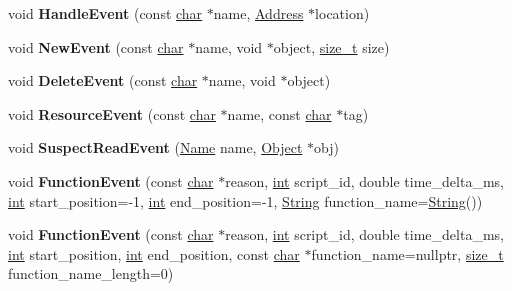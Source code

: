 \begin{DoxyCompactItemize}
void {\bfseries Handle\+Event} (const \mbox{\hyperlink{classchar}{char}} $\ast$name, \mbox{\hyperlink{classuintptr__t}{Address}} $\ast$location)
\item 
\mbox{\label{classv8_1_1internal_1_1Logger_a32c89d2d5ca535c3e0b9e00b73275528}} 
void {\bfseries New\+Event} (const \mbox{\hyperlink{classchar}{char}} $\ast$name, void $\ast$object, \mbox{\hyperlink{classsize__t}{size\+\_\+t}} size)
\item 
\mbox{\label{classv8_1_1internal_1_1Logger_a1d8c8690eb3d3d0a3e784da1d6fea25e}} 
void {\bfseries Delete\+Event} (const \mbox{\hyperlink{classchar}{char}} $\ast$name, void $\ast$object)
\item 
\mbox{\label{classv8_1_1internal_1_1Logger_a6c913c6d1dc334b9b34804ffa5eaf57c}} 
void {\bfseries Resource\+Event} (const \mbox{\hyperlink{classchar}{char}} $\ast$name, const \mbox{\hyperlink{classchar}{char}} $\ast$tag)
\item 
\mbox{\label{classv8_1_1internal_1_1Logger_a4e00e3d702c9a6d2da4bea62467ab8cc}} 
void {\bfseries Suspect\+Read\+Event} (\mbox{\hyperlink{classv8_1_1internal_1_1Name}{Name}} name, \mbox{\hyperlink{classv8_1_1internal_1_1Object}{Object}} $\ast$obj)
\item 
\mbox{\label{classv8_1_1internal_1_1Logger_acf497a20b84038301ae19e42f010e91d}} 
void {\bfseries Function\+Event} (const \mbox{\hyperlink{classchar}{char}} $\ast$reason, \mbox{\hyperlink{classint}{int}} script\+\_\+id, double time\+\_\+delta\+\_\+ms, \mbox{\hyperlink{classint}{int}} start\+\_\+position=-\/1, \mbox{\hyperlink{classint}{int}} end\+\_\+position=-\/1, \mbox{\hyperlink{classv8_1_1internal_1_1String}{String}} function\+\_\+name=\mbox{\hyperlink{classv8_1_1internal_1_1String}{String}}())
\item 
\mbox{\label{classv8_1_1internal_1_1Logger_a02a5cd42681aa0f59ac06f49ba0a971a}} 
void {\bfseries Function\+Event} (const \mbox{\hyperlink{classchar}{char}} $\ast$reason, \mbox{\hyperlink{classint}{int}} script\+\_\+id, double time\+\_\+delta\+\_\+ms, \mbox{\hyperlink{classint}{int}} start\+\_\+position, \mbox{\hyperlink{classint}{int}} end\+\_\+position, const \mbox{\hyperlink{classchar}{char}} $\ast$function\+\_\+name=nullptr, \mbox{\hyperlink{classsize__t}{size\+\_\+t}} function\+\_\+name\+\_\+length=0)

\end{DoxyCompactItemize}
